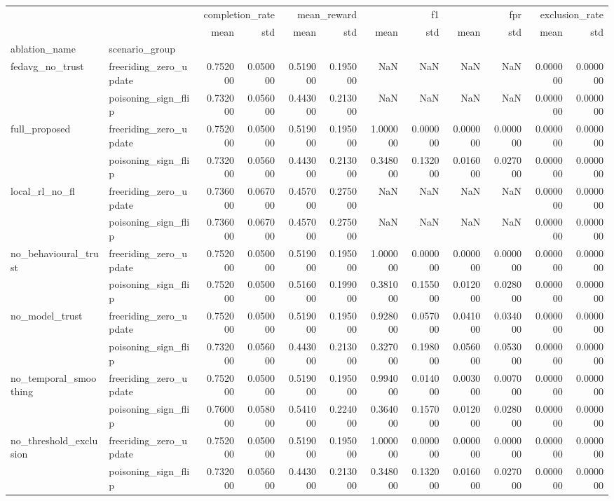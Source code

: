 \begin{tabular}{llrrrrrrrrrr}
\toprule
 &  & \multicolumn{2}{r}{completion_rate} & \multicolumn{2}{r}{mean_reward} & \multicolumn{2}{r}{f1} & \multicolumn{2}{r}{fpr} & \multicolumn{2}{r}{exclusion_rate} \\
 &  & mean & std & mean & std & mean & std & mean & std & mean & std \\
ablation_name & scenario_group &  &  &  &  &  &  &  &  &  &  \\
\midrule
\multirow[t]{2}{*}{fedavg_no_trust} & freeriding_zero_update & 0.752000 & 0.050000 & 0.519000 & 0.195000 & NaN & NaN & NaN & NaN & 0.000000 & 0.000000 \\
 & poisoning_sign_flip & 0.732000 & 0.056000 & 0.443000 & 0.213000 & NaN & NaN & NaN & NaN & 0.000000 & 0.000000 \\
\cline{1-12}
\multirow[t]{2}{*}{full_proposed} & freeriding_zero_update & 0.752000 & 0.050000 & 0.519000 & 0.195000 & 1.000000 & 0.000000 & 0.000000 & 0.000000 & 0.000000 & 0.000000 \\
 & poisoning_sign_flip & 0.732000 & 0.056000 & 0.443000 & 0.213000 & 0.348000 & 0.132000 & 0.016000 & 0.027000 & 0.000000 & 0.000000 \\
\cline{1-12}
\multirow[t]{2}{*}{local_rl_no_fl} & freeriding_zero_update & 0.736000 & 0.067000 & 0.457000 & 0.275000 & NaN & NaN & NaN & NaN & 0.000000 & 0.000000 \\
 & poisoning_sign_flip & 0.736000 & 0.067000 & 0.457000 & 0.275000 & NaN & NaN & NaN & NaN & 0.000000 & 0.000000 \\
\cline{1-12}
\multirow[t]{2}{*}{no_behavioural_trust} & freeriding_zero_update & 0.752000 & 0.050000 & 0.519000 & 0.195000 & 1.000000 & 0.000000 & 0.000000 & 0.000000 & 0.000000 & 0.000000 \\
 & poisoning_sign_flip & 0.752000 & 0.050000 & 0.516000 & 0.199000 & 0.381000 & 0.155000 & 0.012000 & 0.028000 & 0.000000 & 0.000000 \\
\cline{1-12}
\multirow[t]{2}{*}{no_model_trust} & freeriding_zero_update & 0.752000 & 0.050000 & 0.519000 & 0.195000 & 0.928000 & 0.057000 & 0.041000 & 0.034000 & 0.000000 & 0.000000 \\
 & poisoning_sign_flip & 0.732000 & 0.056000 & 0.443000 & 0.213000 & 0.327000 & 0.198000 & 0.056000 & 0.053000 & 0.000000 & 0.000000 \\
\cline{1-12}
\multirow[t]{2}{*}{no_temporal_smoothing} & freeriding_zero_update & 0.752000 & 0.050000 & 0.519000 & 0.195000 & 0.994000 & 0.014000 & 0.003000 & 0.007000 & 0.000000 & 0.000000 \\
 & poisoning_sign_flip & 0.760000 & 0.058000 & 0.541000 & 0.224000 & 0.364000 & 0.157000 & 0.012000 & 0.028000 & 0.000000 & 0.000000 \\
\cline{1-12}
\multirow[t]{2}{*}{no_threshold_exclusion} & freeriding_zero_update & 0.752000 & 0.050000 & 0.519000 & 0.195000 & 1.000000 & 0.000000 & 0.000000 & 0.000000 & 0.000000 & 0.000000 \\
 & poisoning_sign_flip & 0.732000 & 0.056000 & 0.443000 & 0.213000 & 0.348000 & 0.132000 & 0.016000 & 0.027000 & 0.000000 & 0.000000 \\
\cline{1-12}
\bottomrule
\end{tabular}
